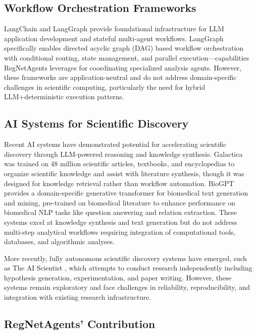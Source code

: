 \documentclass[11pt]{article}
\begin{document}
\subsection{Workflow Orchestration Frameworks}

LangChain and LangGraph \cite{langgraph} provide foundational infrastructure for LLM application development and stateful multi-agent workflows. LangGraph specifically enables directed acyclic graph (DAG) based workflow orchestration with conditional routing, state management, and parallel execution---capabilities RegNetAgents leverages for coordinating specialized analysis agents. However, these frameworks are application-neutral and do not address domain-specific challenges in scientific computing, particularly the need for hybrid LLM+deterministic execution patterns.

\subsection{AI Systems for Scientific Discovery}

Recent AI systems have demonstrated potential for accelerating scientific discovery through LLM-powered reasoning and knowledge synthesis. Galactica \cite{galactica2022} was trained on 48 million scientific articles, textbooks, and encyclopedias to organize scientific knowledge and assist with literature synthesis, though it was designed for knowledge retrieval rather than workflow automation. BioGPT \cite{biogpt2022} provides a domain-specific generative transformer for biomedical text generation and mining, pre-trained on biomedical literature to enhance performance on biomedical NLP tasks like question answering and relation extraction. These systems excel at knowledge synthesis and text generation but do not address multi-step analytical workflows requiring integration of computational tools, databases, and algorithmic analyses.

More recently, fully autonomous scientific discovery systems have emerged, such as The AI Scientist \cite{aiscientist2024}, which attempts to conduct research independently including hypothesis generation, experimentation, and paper writing. However, these systems remain exploratory and face challenges in reliability, reproducibility, and integration with existing research infrastructure.

\subsection{RegNetAgents' Contribution}
\end{document}
